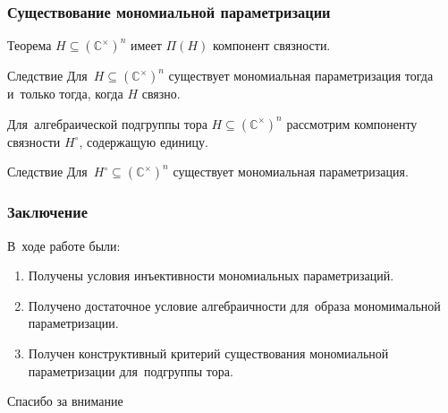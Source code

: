 \documentclass{beamer}
\begin{document}
\begin{frame}
  \frametitle{Существование мономиальной параметризации}

  \begin{block}{Теорема}
    $H \subseteq (\mathbb{C}^\times)^n$ имеет $\Pi(H)$ компонент связности.
  \end{block}

  \begin{block}{Следствие}
    Для~$H \subseteq (\mathbb{C}^\times)^n$ существует мономиальная параметризация
    тогда и~только тогда, когда $H$ связно.
  \end{block}

  Для~алгебраической подгруппы тора $H \subseteq (\mathbb{C}^\times)^n$ рассмотрим компоненту
  связности $H^\circ$, содержащую единицу.

  \begin{block}{Следствие}
    Для~$H^\circ \subseteq (\mathbb{C}^\times)^n$ существует мономиальная параметризация.
  \end{block}
\end{frame}

\begin{frame}
  \frametitle{Заключение}

  В~ходе работе были:

  \begin{enumerate}
    \item Получены условия инъективности мономиальных параметризаций.
    \item Получено достаточное условие алгебраичности для~образа мономимальной параметризации.
    \item Получен конструктивный критерий существования мономиальной параметризации для~подгруппы тора.
  \end{enumerate}
\end{frame}

\begin{frame}
  \centering \Huge{Спасибо за внимание}
\end{frame}
\end{document}
